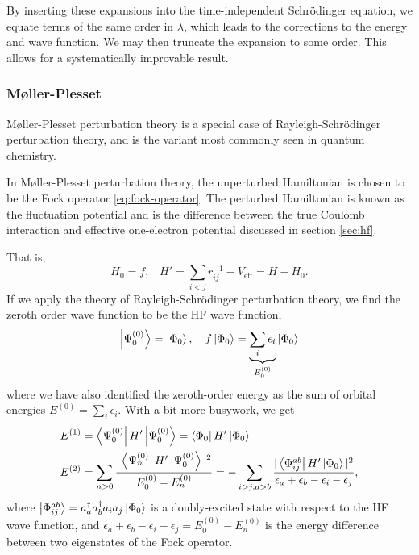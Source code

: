 By inserting these expansions into the time-independent Schr\"odinger equation, we equate terms of the same order in $\lambda$, which leads to the corrections to the energy and wave function. We may then truncate the expansion to some order. This allows for a systematically improvable result.

\subsubsection{M{\o}ller-Plesset}

M{\o}ller-Plesset perturbation theory is a special case of Rayleigh-Schr\"odinger perturbation theory, and is the variant most commonly seen in quantum chemistry.

In M{\o}ller-Plesset perturbation theory, the unperturbed Hamiltonian is chosen to be the Fock operator \ref{eq:fock-operator}. The perturbed Hamiltonian is known as the fluctuation potential and is the difference between the true Coulomb interaction and effective one-electron potential discussed in section \ref{sec:hf}.

That is,
\begin{equation}
    H_0 = f, \hspace{10pt} H' = \sum_{i<j} r_{ij}^{-1}-V_\mathrm{eff} = H-H_0.
\end{equation}
If we apply the theory of Rayleigh-Schr\"odinger perturbation theory, we find the zeroth order wave function to be the \gls{HF} wave function,
\begin{equation}
    \ket{\Psi_0^{(0)}} = \ket{\Phi_0}, \hspace{10pt}
    f\ket{\Phi_0} = \underbrace{\sum_i\epsilon_i}_{E_0^{(0)}}\ket{\Phi_0}
\end{equation}
where we have also identified the zeroth-order energy as the sum of orbital energies $E^{(0)}=\sum_i\epsilon_i$. With a bit more busywork, we get
\begin{align}
    E^{(1)} &= \bra{\Psi_0^{(0)}}H'\ket{\Psi_0^{(0)}} = \bra{\Phi_0}H'\ket{\Phi_0} \\
    E^{(2)} &=
    \sum_{n>0} \frac{|\bra{\Psi_n^{(0)}}H'\ket{\Psi_0^{(0)}}|^2}{E_0^{(0)}-E_n^{(0)}} =
    -\sum_{i>j,a>b}\frac{|\bra{\Phi_{ij}^{ab}}H'\ket{\Phi_0}|^2}{\epsilon_a+\epsilon_b-\epsilon_i-\epsilon_j},
\end{align}
where $\ket{\Phi_{ij}^{ab}}=a_a^\dag a_b^\dag a_ia_j\ket{\Phi_0}$ is a doubly-excited state with respect to the HF wave function, and $\epsilon_a+\epsilon_b-\epsilon_i-\epsilon_j = E_0^{(0)} - E_n^{(0)}$ is the energy difference between two eigenstates of the Fock operator.


